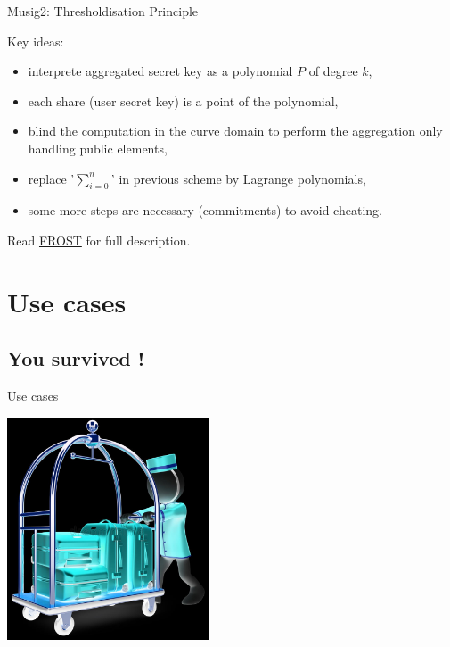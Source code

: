 \documentclass[aspectratio=43]{beamer}
\begin{document}
\begin{frame}{Musig2: Thresholdisation Principle}
{}
{
Key ideas:
\begin{itemize}
\item interprete aggregated secret key as a polynomial $P$ of degree $k$,
\item each share (user secret key) is a point of the polynomial,
\item blind the computation in the curve domain to perform the aggregation only handling public elements,
\item replace '$\sum_{i=0}^n$' in previous scheme by Lagrange polynomials,
\item some more steps are necessary (commitments) to avoid cheating.
\end{itemize}

Read \href{https://eprint.iacr.org/2020/852.pdf}{{\cyan FROST}} for full description.

}



\end{frame}  



 \section{Use cases}
 
\subsection*{You survived !}
 
 
 
\begin{frame}{Use cases}


\begin{center}
\includegraphics[width=6cm]{images/usecases.jpg}
\end{center}           

\end{frame}
\end{document}
